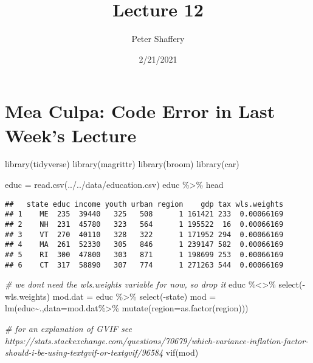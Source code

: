 \documentclass[
]{article}
\title{Lecture 12}
\author{Peter Shaffery}
\date{2/21/2021}
\newenvironment{Shaded}{\begin{snugshade}}{\end{snugshade}}
\newcommand{\AttributeTok}[1]{\textcolor[rgb]{0.77,0.63,0.00}{#1}}
\newcommand{\CommentTok}[1]{\textcolor[rgb]{0.56,0.35,0.01}{\textit{#1}}}
\newcommand{\FunctionTok}[1]{\textcolor[rgb]{0.00,0.00,0.00}{#1}}
\newcommand{\NormalTok}[1]{#1}
\newcommand{\OtherTok}[1]{\textcolor[rgb]{0.56,0.35,0.01}{#1}}
\newcommand{\SpecialCharTok}[1]{\textcolor[rgb]{0.00,0.00,0.00}{#1}}
\newcommand{\StringTok}[1]{\textcolor[rgb]{0.31,0.60,0.02}{#1}}
\begin{document}
\maketitle

\hypertarget{mea-culpa-code-error-in-last-weeks-lecture}{%
\section{Mea Culpa: Code Error in Last Week's
Lecture}\label{mea-culpa-code-error-in-last-weeks-lecture}}

\begin{Shaded}
\begin{Highlighting}[]
\FunctionTok{library}\NormalTok{(tidyverse)}
\FunctionTok{library}\NormalTok{(magrittr)}
\FunctionTok{library}\NormalTok{(broom)}
\FunctionTok{library}\NormalTok{(car)}

\NormalTok{educ }\OtherTok{=} \FunctionTok{read.csv}\NormalTok{(}\StringTok{\textquotesingle{}../../data/education.csv\textquotesingle{}}\NormalTok{)}
\NormalTok{educ }\SpecialCharTok{\%\textgreater{}\%}\NormalTok{ head}
\end{Highlighting}
\end{Shaded}

\begin{verbatim}
##   state educ income youth urban region    gdp tax wls.weights
## 1    ME  235  39440   325   508      1 161421 233  0.00066169
## 2    NH  231  45780   323   564      1 195522  16  0.00066169
## 3    VT  270  40110   328   322      1 171952 294  0.00066169
## 4    MA  261  52330   305   846      1 239147 582  0.00066169
## 5    RI  300  47800   303   871      1 198699 253  0.00066169
## 6    CT  317  58890   307   774      1 271263 544  0.00066169
\end{verbatim}

\begin{Shaded}
\begin{Highlighting}[]
\CommentTok{\# we don\textquotesingle{}t need the wls.weights variable for now, so drop it}
\NormalTok{educ }\SpecialCharTok{\%\textless{}\textgreater{}\%} \FunctionTok{select}\NormalTok{(}\SpecialCharTok{{-}}\NormalTok{wls.weights)}
\NormalTok{mod.dat }\OtherTok{=}\NormalTok{ educ }\SpecialCharTok{\%\textgreater{}\%} \FunctionTok{select}\NormalTok{(}\SpecialCharTok{{-}}\NormalTok{state)}
\NormalTok{mod }\OtherTok{=} \FunctionTok{lm}\NormalTok{(educ}\SpecialCharTok{\textasciitilde{}}\NormalTok{.,}\AttributeTok{data=}\NormalTok{mod.dat}\SpecialCharTok{\%\textgreater{}\%} \FunctionTok{mutate}\NormalTok{(}\StringTok{\textquotesingle{}region\textquotesingle{}}\OtherTok{=}\FunctionTok{as.factor}\NormalTok{(region)))}

\CommentTok{\# for an explanation of GVIF see https://stats.stackexchange.com/questions/70679/which{-}variance{-}inflation{-}factor{-}should{-}i{-}be{-}using{-}textgvif{-}or{-}textgvif/96584}
\FunctionTok{vif}\NormalTok{(mod)}
\end{Highlighting}
\end{Shaded}
\end{document}
